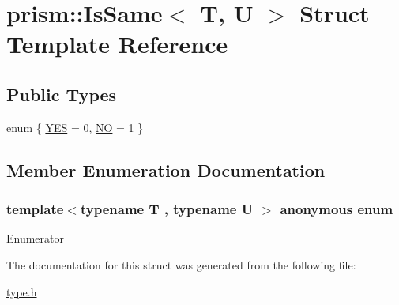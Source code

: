 \hypertarget{structprism_1_1_is_same}{}\section{prism\+:\+:Is\+Same$<$ T, U $>$ Struct Template Reference}
\label{structprism_1_1_is_same}
\subsection*{Public Types}
\begin{DoxyCompactItemize}
\item 
enum \{ \hyperlink{structprism_1_1_is_same_afa2a4b289546edcea1b2bfbbb8be1fd5a1267b6ab15e16ecd2a07e07181845213}{Y\+ES} = 0, 
\hyperlink{structprism_1_1_is_same_afa2a4b289546edcea1b2bfbbb8be1fd5a000205d9841c1a32e2f8433d7215cff8}{NO} = 1
 \}
\end{DoxyCompactItemize}


\subsection{Member Enumeration Documentation}
\subsubsection[{\texorpdfstring{anonymous enum}{anonymous enum}}]{\setlength{\rightskip}{0pt plus 5cm}template$<$typename T , typename U $>$ anonymous enum}\hypertarget{structprism_1_1_is_same_afa2a4b289546edcea1b2bfbbb8be1fd5}{}\label{structprism_1_1_is_same_afa2a4b289546edcea1b2bfbbb8be1fd5}
\begin{Desc}
\item[Enumerator]\par
\begin{description}
\item[{\em 
Y\+ES\hypertarget{structprism_1_1_is_same_afa2a4b289546edcea1b2bfbbb8be1fd5a1267b6ab15e16ecd2a07e07181845213}{}\label{structprism_1_1_is_same_afa2a4b289546edcea1b2bfbbb8be1fd5a1267b6ab15e16ecd2a07e07181845213}
}]\item[{\em 
NO\hypertarget{structprism_1_1_is_same_afa2a4b289546edcea1b2bfbbb8be1fd5a000205d9841c1a32e2f8433d7215cff8}{}\label{structprism_1_1_is_same_afa2a4b289546edcea1b2bfbbb8be1fd5a000205d9841c1a32e2f8433d7215cff8}
}]\end{description}
\end{Desc}


The documentation for this struct was generated from the following file\+:\begin{DoxyCompactItemize}
\item 
\hyperlink{type_8h}{type.\+h}\end{DoxyCompactItemize}

